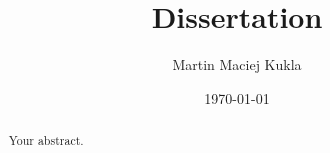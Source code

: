 \documentclass[a4paper]{article}
\title{Dissertation}
\date{\today}
\author{Martin Maciej Kukla}
\begin{document}


\begin{abstract}
Your abstract.
\end{abstract}


\tableofcontents
\listoffigures















\appendix



\end{document}
